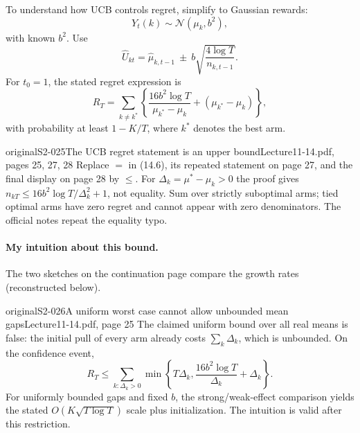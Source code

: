 To understand how UCB controls regret, simplify to Gaussian rewards:
\[
 Y_t(k)\sim\mathcal N(\mu_k,b^2),\tag{14.4}
\]
with known $b^2$.  Use
\[
 \widehat U_{kt}=\widehat\mu_{k,t-1}
 \ \pm\ b\sqrt{\frac{4\log T}{n_{k,t-1}}}.\tag{14.5}
\]
For $t_0=1$, the stated regret expression is
\[
 R_T=\sum_{k\ne k^*}
 \left\{\frac{16b^2\log T}{\mu_{k^*}-\mu_k}
 +(\mu_{k^*}-\mu_k)\right\},\tag{14.6}
\]
with probability at least $1-K/T$, where $k^*$ denotes the best arm.

\begin{reviewnote}{original}{S2-025}{The UCB regret statement is an upper bound}{Lecture11-14.pdf, pages 25, 27, 28}
Replace $=$ in (14.6), its repeated statement on page 27, and the final display on page 28 by $\le$. For $\Delta_k=\mu^*-\mu_k>0$ the proof gives $n_{kT}\le16b^2\log T/\Delta_k^2+1$, not equality. Sum over strictly suboptimal arms; tied optimal arms have zero regret and cannot appear with zero denominators. The official notes repeat the equality typo.
\end{reviewnote}


\paragraph{My intuition about this bound.}

 The two sketches on the continuation page compare the growth rates (reconstructed below).

\begin{reviewnote}{original}{S2-026}{A uniform worst case cannot allow unbounded mean gaps}{Lecture11-14.pdf, page 25}
The claimed uniform bound over all real means is false: the initial pull of every arm already costs $\sum_k\Delta_k$, which is unbounded. On the confidence event,
\[
 R_T\le\sum_{k:\Delta_k>0}\min\left\{T\Delta_k,\frac{16b^2\log T}{\Delta_k}+\Delta_k\right\}.
\]
For uniformly bounded gaps and fixed $b$, the strong/weak-effect comparison yields the stated $O(K\sqrt{T\log T})$ scale plus initialization. The intuition is valid after this restriction.
\end{reviewnote}


